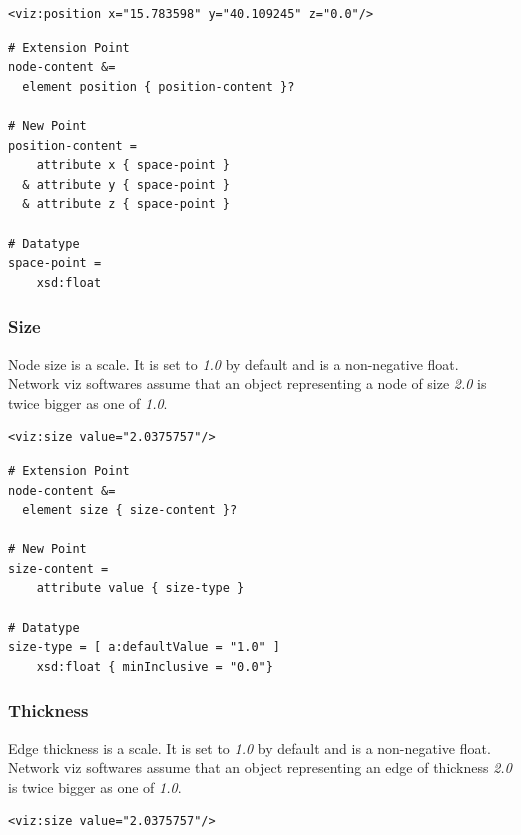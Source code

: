 \documentclass[a4paper,10pt]{article}
\begin{document}
\lstset{ style=gexf }
\begin{lstlisting}[caption={VIZ Position Declaration},label=vizposition]
<viz:position x="15.783598" y="40.109245" z="0.0"/>
\end{lstlisting}

\lstset{ style=rnc }
\begin{lstlisting}[caption={Position Specification},label=positionRNC]
# Extension Point
node-content &=
  element position { position-content }?

# New Point
position-content =
    attribute x { space-point }
  & attribute y { space-point }
  & attribute z { space-point }

# Datatype
space-point =
    xsd:float
\end{lstlisting}

\subsubsection{Size}

Node size is a scale. It is set to \textit{1.0} by default and is a non-negative float. Network viz softwares assume that an object representing a node of size \textit{2.0} is twice bigger as one of \textit{1.0}.

\lstset{ style=gexf }
\begin{lstlisting}[caption={VIZ Size Declaration},label=vizsize]
<viz:size value="2.0375757"/>
\end{lstlisting}

\lstset{ style=rnc }
\begin{lstlisting}[caption={Size Specification},label=sizeRNC]
# Extension Point
node-content &=
  element size { size-content }?

# New Point
size-content =
    attribute value { size-type }

# Datatype
size-type = [ a:defaultValue = "1.0" ]
    xsd:float { minInclusive = "0.0"}
\end{lstlisting}

\subsubsection{Thickness}

Edge thickness is a scale. It is set to \textit{1.0} by default and is a non-negative float. Network viz softwares assume that an object representing an edge of thickness \textit{2.0} is twice bigger as one of \textit{1.0}.

\lstset{ style=gexf }
\begin{lstlisting}[caption={VIZ Thickness Declaration},label=vizthickness]
<viz:size value="2.0375757"/>
\end{lstlisting}
\end{document}
